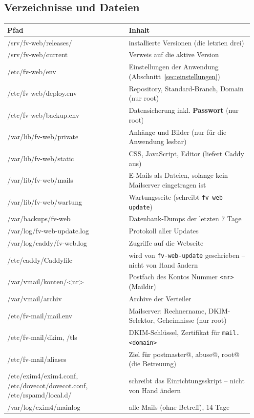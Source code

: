 \documentclass[a4paper,fontsize=10pt]{scrartcl}
\newcommand*{\cmd}[1]{\texttt{#1}}
\begin{document}
\subsection{Verzeichnisse und Dateien}

\begin{center}
\small
\begin{tabularx}{\textwidth}{@{}>{\ttfamily}lX@{}}
\toprule
\textbf{\sffamily Pfad} & \textbf{Inhalt} \\
\midrule
/srv/fv-web/releases/      & installierte Versionen (die letzten drei) \\
/srv/fv-web/current        & Verweis auf die aktive Version \\
/etc/fv-web/env            & Einstellungen der Anwendung (Abschnitt~\ref{sec:einstellungen}) \\
/etc/fv-web/deploy.env     & Repository, Standard-Branch, Domain (nur root) \\
/etc/fv-web/backup.env     & Datensicherung inkl. \textbf{Passwort} (nur root) \\
/var/lib/fv-web/private    & Anhänge und Bilder (nur für die Anwendung lesbar) \\
/var/lib/fv-web/static     & CSS, JavaScript, Editor (liefert Caddy aus) \\
/var/lib/fv-web/mails      & E-Mails als Dateien, solange kein Mailserver eingetragen ist \\
/var/lib/fv-web/wartung    & Wartungsseite (schreibt \cmd{fv-web-update}) \\
/var/backups/fv-web        & Datenbank-Dumps der letzten 7 Tage \\
/var/log/fv-web-update.log & Protokoll aller Updates \\
/var/log/caddy/fv-web.log  & Zugriffe auf die Webseite \\
/etc/caddy/Caddyfile       & wird von \cmd{fv-web-update} geschrieben -- nicht von Hand ändern \\
\midrule
/var/vmail/konten/<nr>     & Postfach des Kontos Nummer \cmd{<nr>} (Maildir) \\
/var/vmail/archiv          & Archive der Verteiler \\
/etc/fv-mail/mail.env      & Mailserver: Rechnername, DKIM-Selektor, Geheimnisse (nur root) \\
/etc/fv-mail/dkim, /tls    & DKIM-Schlüssel, Zertifikat für \cmd{mail.<domain>} \\
/etc/fv-mail/aliases       & Ziel für postmaster@, abuse@, root@ (die Betreuung) \\
/etc/exim4/exim4.conf, /etc/dovecot/dovecot.conf, /etc/rspamd/local.d/
                           & schreibt das Einrichtungsskript -- nicht von Hand ändern \\
/var/log/exim4/mainlog     & alle Mails (ohne Betreff), 14 Tage \\
\bottomrule
\end{tabularx}
\end{center}
\end{document}
